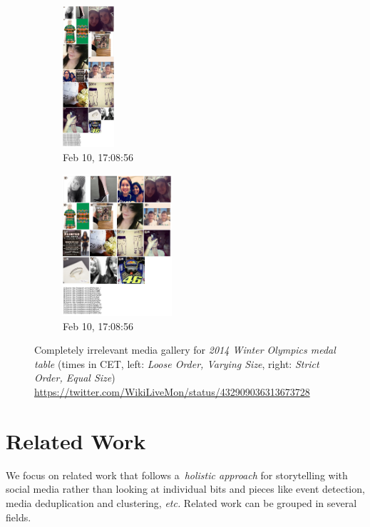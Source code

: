 \documentclass{sig-alternate}
\newcommand{\inlinelistingsize}{\fontsize{8pt}{11pt}}
\let\oldurl\url
\renewcommand{\url}[1]{\inlinelistingsize\oldurl{#1}}
\begin{document}
\begin{figure}[p!]
  \centering
  \begin{subfigure}[t]{0.25\textwidth}
    \includegraphics[height=5.25cm]{figures/medal_table/mediagallery_looseOrder_1392048536608.png}
    \caption{Feb 10, 17:08:56}
    \label{fig:1392048536608}
  \end{subfigure}%
  \begin{subfigure}[t]{0.25\textwidth}
    \includegraphics[height=5.25cm]{figures/medal_table/mediagallery_strictOrder_1392048536209.png}
    \caption{Feb 10, 17:08:56}
    \label{fig:1392048536209}
  \end{subfigure}
  \caption{Completely irrelevant media gallery for
    \emph{2014 Winter Olympics medal table}
    (times in CET, left: \emph{Loose Order, Varying Size},
    right: \emph{Strict Order, Equal Size})    
    \url{https://twitter.com/WikiLiveMon/status/432909036313673728}}
  \label{fig:medal-table}
\end{figure}

\section{Related Work}
\label{sec:related-work}
\selectfont

We focus on related work that follows a~\emph{holistic approach}
for storytelling with social media
rather than looking at individual bits and pieces
like event detection, media deduplication and clustering, \emph{etc.}
Related work can be grouped in several fields.
\end{document}
